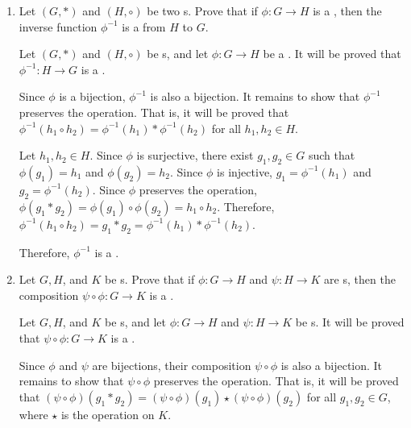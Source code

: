\begin{enumerate}
  \item Let \((G, *)\) and \((H, \circ)\) be two s.
  Prove that if \(\phi: G \to H\) is a , then the inverse function \(\phi^{-1}\) is a  from \(H\) to \(G\).
  \begin{subprove}
    Let \((G, *)\) and \((H, \circ)\) be s, and let \(\phi: G \to H\) be a .
    It will be proved that \(\phi^{-1}: H \to G\) is a .
    
    Since \(\phi\) is a bijection, \(\phi^{-1}\) is also a bijection.
    It remains to show that \(\phi^{-1}\) preserves the operation.
    That is, it will be proved that \(\phi^{-1}(h_{1} \circ h_{2}) = \phi^{-1}(h_{1}) * \phi^{-1}(h_{2})\) for all \(h_{1}, h_{2} \in H\).
    
    Let \(h_{1}, h_{2} \in H\).
    Since \(\phi\) is surjective, there exist \(g_{1}, g_{2} \in G\) such that \(\phi(g_{1}) = h_{1}\) and \(\phi(g_{2}) = h_{2}\).
    Since \(\phi\) is injective, \(g_{1} = \phi^{-1}(h_{1})\) and \(g_{2} = \phi^{-1}(h_{2})\).
    Since \(\phi\) preserves the operation, \(\phi(g_{1} * g_{2}) = \phi(g_{1}) \circ \phi(g_{2}) = h_{1} \circ h_{2}\).
    Therefore, \(\phi^{-1}(h_{1} \circ h_{2}) = g_{1} * g_{2} = \phi^{-1}(h_{1}) * \phi^{-1}(h_{2})\).
    
    Therefore, \(\phi^{-1}\) is a .
  \end{subprove}
  \item Let \(G, H\), and \(K\) be s.
  Prove that if \(\phi: G \to H\) and \(\psi: H \to K\) are s, then the composition \(\psi \circ \phi: G \to K\) is a .
  \begin{subprove}
    Let \(G, H\), and \(K\) be s, and let \(\phi: G \to H\) and \(\psi: H \to K\) be s.
    It will be proved that \(\psi \circ \phi: G \to K\) is a .
    
    Since \(\phi\) and \(\psi\) are bijections, their composition \(\psi \circ \phi\) is also a bijection.
    It remains to show that \(\psi \circ \phi\) preserves the operation.
    That is, it will be proved that \((\psi \circ \phi)(g_{1} * g_{2}) = (\psi \circ \phi)(g_{1}) \star (\psi \circ \phi)(g_{2})\) for all \(g_{1}, g_{2} \in G\), where \(\star\) is the operation on \(K\).
    

\end{subprove}
\end{enumerate}
